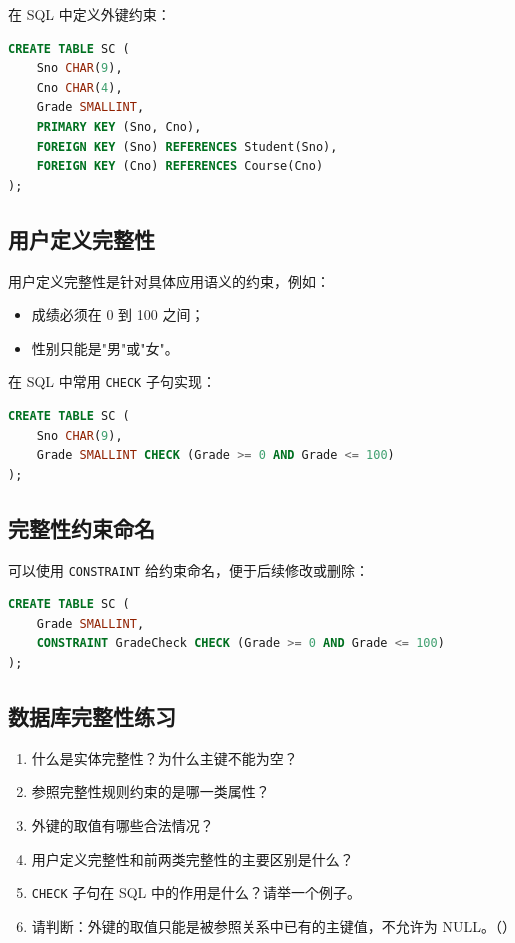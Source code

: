 \documentclass{../../note}
\begin{document}
在 SQL 中定义外键约束：

\begin{lstlisting}[language=SQL]
CREATE TABLE SC (
    Sno CHAR(9),
    Cno CHAR(4),
    Grade SMALLINT,
    PRIMARY KEY (Sno, Cno),
    FOREIGN KEY (Sno) REFERENCES Student(Sno),
    FOREIGN KEY (Cno) REFERENCES Course(Cno)
);
\end{lstlisting}

\subsection{用户定义完整性}

用户定义完整性是针对具体应用语义的约束，例如：

\begin{itemize}
  \item 成绩必须在 0 到 100 之间；
  \item 性别只能是"男"或"女"。
\end{itemize}

在 SQL 中常用 \texttt{CHECK} 子句实现：

\begin{lstlisting}[language=SQL]
CREATE TABLE SC (
    Sno CHAR(9),
    Grade SMALLINT CHECK (Grade >= 0 AND Grade <= 100)
);
\end{lstlisting}

\subsection{完整性约束命名}

可以使用 \texttt{CONSTRAINT} 给约束命名，便于后续修改或删除：

\begin{lstlisting}[language=SQL]
CREATE TABLE SC (
    Grade SMALLINT,
    CONSTRAINT GradeCheck CHECK (Grade >= 0 AND Grade <= 100)
);
\end{lstlisting}

\subsection{数据库完整性练习}

\begin{enumerate}
  \item 什么是实体完整性？为什么主键不能为空？
  \item 参照完整性规则约束的是哪一类属性？
  \item 外键的取值有哪些合法情况？
  \item 用户定义完整性和前两类完整性的主要区别是什么？
  \item \texttt{CHECK} 子句在 SQL 中的作用是什么？请举一个例子。
  \item 请判断：外键的取值只能是被参照关系中已有的主键值，不允许为 NULL。（\hspace{1cm}）
\end{enumerate}
\end{document}
